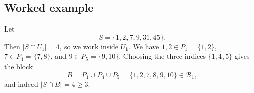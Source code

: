 \documentclass[11pt]{article}
\begin{document}

\subsection*{Worked example}
Let
\[
S=\{1,2,7,9,31,45\}.
\]
Then $|S\cap U_1|=4$, so we work inside $U_1$.
We have $1,2\in P_1=\{1,2\}$, $7\in P_4=\{7,8\}$, and $9\in P_5=\{9,10\}$.
Choosing the three indices $\{1,4,5\}$ gives the block
\[
B=P_1\cup P_4\cup P_5=\{1,2,7,8,9,10\}\in\mathcal{B}_1,
\]
and indeed $|S\cap B|=4\ge 3$.

\end{document}
